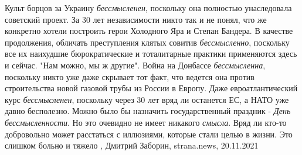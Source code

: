 Культ борцов за Украину \emph{бессмысленен}, поскольку она полностью унаследовала
советский проект. За 30 лет независимости никто так и не понял, что же
конкретно хотели построить герои Холодного Яра и Степан Бандера.  В качестве
продолжения, обличать преступления клятых совитив \emph{бессмысленно}, поскольку все
их наихудшие бюрократические и тоталитарные практики применяются здесь и
сейчас. "Нам можно, мы ж другие".  Война на Донбассе \emph{бессмысленна}, поскольку
никто уже даже скрывает тот факт, что ведется она против строительства новой
газовой трубы из России в Европу.  Даже евроатлантический курс \emph{бессмысленен},
поскольку через 30 лет вряд ли останется ЕС, а НАТО уже давно бесполезно.
Можно было бы назначить государственный праздник - \emph{День бессмысленности}. Но это
очевидно не имеет никакого \emph{смысла}. Вряд ли кто-то добровольно может расстаться
с иллюзиями, которые стали целью в жизни. Это слишком больно и тяжело
, 
Дмитрий Заборин, strana.news, 20.11.2021

